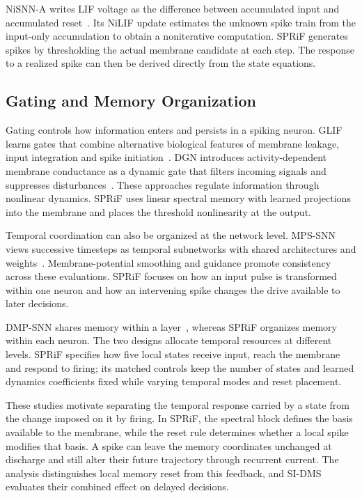\documentclass[letterpaper,journal]{IEEEtran}
\begin{document}
NiSNN-A writes LIF voltage as the difference between accumulated input and accumulated reset~\cite{nisnna2025}. Its NiLIF update estimates the unknown spike train from the input-only accumulation to obtain a noniterative computation. SPRiF generates spikes by thresholding the actual membrane candidate at each step. The response to a realized spike can then be derived directly from the state equations.

\subsection{Gating and Memory Organization}

Gating controls how information enters and persists in a spiking neuron. GLIF learns gates that combine alternative biological features of membrane leakage, input integration and spike initiation~\cite{glif}. DGN introduces activity-dependent membrane conductance as a dynamic gate that filters incoming signals and suppresses disturbances~\cite{dgn}. These approaches regulate information through nonlinear dynamics. SPRiF uses linear spectral memory with learned projections into the membrane and places the threshold nonlinearity at the output.

Temporal coordination can also be organized at the network level. MPS-SNN views successive timesteps as temporal subnetworks with shared architectures and weights~\cite{mpssnn}. Membrane-potential smoothing and guidance promote consistency across these evaluations. SPRiF focuses on how an input pulse is transformed within one neuron and how an intervening spike changes the drive available to later decisions.

DMP-SNN shares memory within a layer~\cite{sun2026dmp}, whereas SPRiF organizes memory within each neuron. The two designs allocate temporal resources at different levels. SPRiF specifies how five local states receive input, reach the membrane and respond to firing; its matched controls keep the number of states and learned dynamics coefficients fixed while varying temporal modes and reset placement.

These studies motivate separating the temporal response carried by a state from the change imposed on it by firing. In SPRiF, the spectral block defines the basis available to the membrane, while the reset rule determines whether a local spike modifies that basis. A spike can leave the memory coordinates unchanged at discharge and still alter their future trajectory through recurrent current. The analysis distinguishes local memory reset from this feedback, and SI-DMS evaluates their combined effect on delayed decisions.
\end{document}
